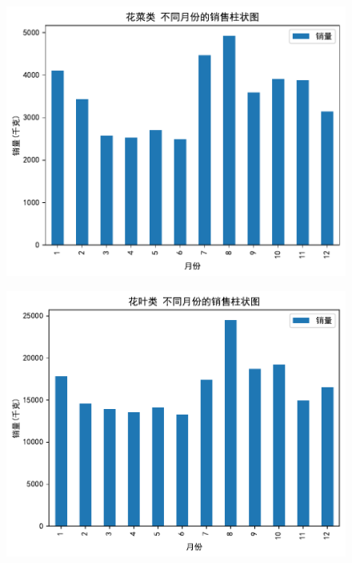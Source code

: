\documentclass{cumcmthesis} %
\begin{document}
\begin{figure}[H]
    \centering
    \begin{minipage}[c]{0.45\textwidth}
        \centering
        \includegraphics[width=\textwidth]{fig/花菜_monthly_sales.pdf}
        \label{fig:sample-figure-a}
    \end{minipage}
    \hfill
    \begin{minipage}[c]{0.45\textwidth}
        \centering
        \includegraphics[width=\textwidth]{fig/花叶_monthly_sales.pdf}
        \label{fig:sample-figure-b}
    \end{minipage}
    \vspace{1em} %
    

\end{figure}
\end{document}

